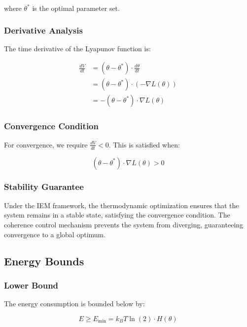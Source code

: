 \documentclass[12pt]{article}
\begin{document}
where $\theta^*$ is the optimal parameter set.

\subsubsection{Derivative Analysis}

The time derivative of the Lyapunov function is:

\begin{align}
\frac{dV}{dt} &= (\theta - \theta^*) \cdot \frac{d\theta}{dt} \\
&= (\theta - \theta^*) \cdot (-\nabla L(\theta)) \\
&= -(\theta - \theta^*) \cdot \nabla L(\theta)
\end{align}

\subsubsection{Convergence Condition}

For convergence, we require $\frac{dV}{dt} < 0$. This is satisfied when:

\begin{equation}
(\theta - \theta^*) \cdot \nabla L(\theta) > 0
\end{equation}

\subsubsection{Stability Guarantee}

Under the IEM framework, the thermodynamic optimization ensures that the system remains in a stable state, satisfying the convergence condition. The coherence control mechanism prevents the system from diverging, guaranteeing convergence to a global optimum.

\subsection{Energy Bounds}

\subsubsection{Lower Bound}

The energy consumption is bounded below by:

\begin{equation}
E \geq E_{\min} = k_B T \ln(2) \cdot H(\theta)
\end{equation}
\end{document}
